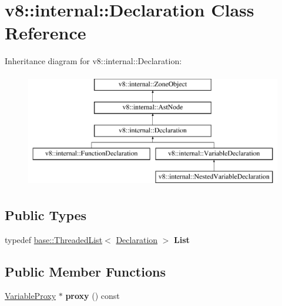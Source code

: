 \hypertarget{classv8_1_1internal_1_1Declaration}{}\section{v8\+:\+:internal\+:\+:Declaration Class Reference}
\label{classv8_1_1internal_1_1Declaration}
Inheritance diagram for v8\+:\+:internal\+:\+:Declaration\+:\begin{figure}[H]
\begin{center}
\leavevmode
\includegraphics[height=5.000000cm]{classv8_1_1internal_1_1Declaration}
\end{center}
\end{figure}
\subsection*{Public Types}
\begin{DoxyCompactItemize}
\item 
\mbox{\label{classv8_1_1internal_1_1Declaration_a878fc6189d4b3f017c732a21cc642070}} 
typedef \mbox{\hyperlink{classv8_1_1base_1_1ThreadedListBase}{base\+::\+Threaded\+List}}$<$ \mbox{\hyperlink{classv8_1_1internal_1_1Declaration}{Declaration}} $>$ {\bfseries List}
\end{DoxyCompactItemize}
\subsection*{Public Member Functions}
\begin{DoxyCompactItemize}
\item 
\mbox{\label{classv8_1_1internal_1_1Declaration_ad8451f41cffd616bd5d39167c07ede9f}} 
\mbox{\hyperlink{classv8_1_1internal_1_1VariableProxy}{Variable\+Proxy}} $\ast$ {\bfseries proxy} () const
\end{DoxyCompactItemize}
